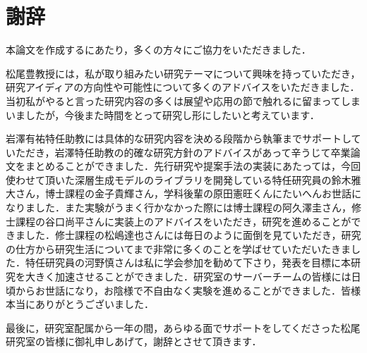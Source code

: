 \chapter*{謝辞}
\label{chap:acknowledgments}
本論文を作成するにあたり，多くの方々にご協力をいただきました．

松尾豊教授には，私が取り組みたい研究テーマについて興味を持っていただき，研究アイディアの方向性や可能性について多くのアドバイスをいただきました．当初私がやると言った研究内容の多くは展望や応用の節で触れるに留まってしまいましたが，今後また時間をとって研究し形にしたいと考えています．

岩澤有祐特任助教には具体的な研究内容を決める段階から執筆までサポートしていただき，岩澤特任助教の的確な研究方針のアドバイスがあって辛うじて卒業論文をまとめることができました．先行研究や提案手法の実装にあたっては，今回使わせて頂いた深層生成モデルのライブラリを開発している特任研究員の鈴木雅大さん，博士課程の金子貴輝さん，学科後輩の原田憲旺くんにたいへんお世話になりました．また実験がうまく行かなかった際には博士課程の阿久澤圭さん，修士課程の谷口尚平さんに実装上のアドバイスをいただき，研究を進めることができました．修士課程の松嶋達也さんには毎日のように面倒を見ていただき，研究の仕方から研究生活についてまで非常に多くのことを学ばせていただいたきました．特任研究員の河野慎さんは私に学会参加を勧めて下さり，発表を目標に本研究を大きく加速させることができました．研究室のサーバーチームの皆様には日頃からお世話になり，お陰様で不自由なく実験を進めることができました．皆様本当にありがとうございました．

最後に，研究室配属から一年の間，あらゆる面でサポートをしてくださった松尾研究室の皆様に御礼申しあげて，謝辞とさせて頂きます．